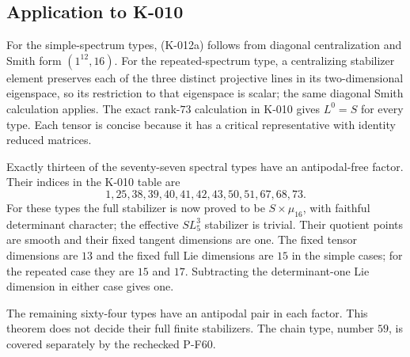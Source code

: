\subsection*{Application to K-010}
For the simple-spectrum types, (K-012a) follows from diagonal
centralization and Smith form $(1^{12},16)$.  For the repeated-spectrum
type, a centralizing stabilizer element preserves each of the three
distinct projective lines in its two-dimensional eigenspace, so its
restriction to that eigenspace is scalar; the same diagonal Smith
calculation applies.  The exact rank-$73$ calculation in K-010 gives
$L^0=S$ for every type.  Each tensor is concise because it has a critical
representative with identity reduced matrices.

Exactly thirteen of the seventy-seven spectral types have an
antipodal-free factor.  Their indices in the K-010 table are
\[
        1,25,38,39,40,41,42,43,50,51,67,68,73.                \tag{K-012e}
\]
For these types the full stabilizer is now proved to be
$S\times\mu_{16}$, with faithful determinant character; the effective
$SL_5^3$ stabilizer is trivial.  Their quotient points are smooth and
their fixed tangent dimensions are one.  The fixed tensor dimensions
are $13$ and the fixed full Lie dimensions are $15$ in the simple cases;
for the repeated case they are $15$ and $17$.  Subtracting the
determinant-one Lie dimension in either case gives one.

The remaining sixty-four types have an antipodal pair in each factor.
This theorem does not decide their full finite stabilizers.  The chain
type, number $59$, is covered separately by the rechecked P-F60.
